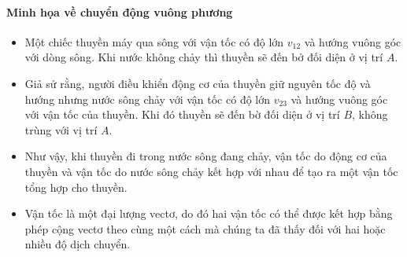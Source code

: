 \paragraph{Minh họa về chuyển động vuông phương}
\begin{itemize}
\item Một chiếc thuyền máy qua sông với vận tốc có độ lớn $v_{12}$ và hướng vuông góc với dòng sông. Khi nước không chảy thì thuyền sẽ đến bở đối diện ở vị trí $A$.
\item Giả sử rằng, người điều khiển động cơ của thuyền giữ nguyên tốc độ và hướng nhưng nước sông chảy với vận tốc có độ lớn $v_{23}$ và hướng vuông góc với vận tốc của thuyền. Khi đó thuyền sẽ đến bờ đối diện ở vị trí $B$, không trùng với vị trí $A$.
\item Như vậy, khi thuyền đi trong nước sông đang chảy, vận tốc do động cơ của thuyền và vận tốc do nước sông chảy kết hợp với nhau để tạo ra một vận tốc tổng hợp cho thuyền.
\item Vận tốc là một đại lượng vectơ, do đó hai vận tốc có thể được kết hợp bằng phép cộng vectơ theo cùng một cách mà chúng ta đã thấy đối với hai hoặc nhiều độ dịch chuyển.
\end{itemize}
\setcounter{vidu}{0}
